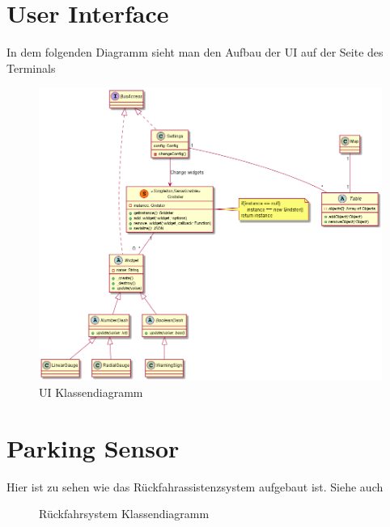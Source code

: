 \documentclass[entwurf.tex]{subfiles}
\begin{document}
  	\section{User Interface}
		In dem folgenden Diagramm sieht man den Aufbau der UI auf der Seite des Terminals
		\begin{figure}[H]
  			\begin{center}
 				\includegraphics[width=\textwidth]{diagrams/UI.png}
  				\caption{UI Klassendiagramm}
  			\end{center}
  		\end{figure}
  		
  		
  		
  	\newpage
  	\section{Parking Sensor}
		Hier ist zu sehen wie das Rückfahrassistenzsystem aufgebaut ist. Siehe auch %
		\begin{figure}[H]
  			\caption{Rückfahrsystem Klassendiagramm}
  		\end{figure}
  	
  	
\end{document}
